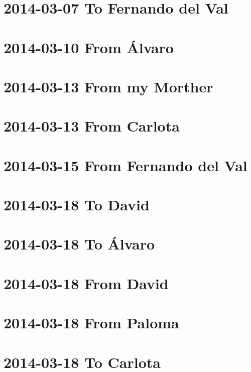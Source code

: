 \documentclass[]{book}
\begin{document}
\hypertarget{to-fernando-del-val}{%
\section{2014-03-07 To Fernando del Val}\label{to-fernando-del-val}}

\hypertarget{from-alvaro}{%
\section{2014-03-10 From Álvaro}\label{from-alvaro}}

\hypertarget{from-my-morther}{%
\section{2014-03-13 From my Morther}\label{from-my-morther}}

\hypertarget{from-carlota}{%
\section{2014-03-13 From Carlota}\label{from-carlota}}

\hypertarget{from-fernando-del-val}{%
\section{2014-03-15 From Fernando del Val}\label{from-fernando-del-val}}

\hypertarget{to-david}{%
\section{2014-03-18 To David}\label{to-david}}

\hypertarget{to-alvaro}{%
\section{2014-03-18 To Álvaro}\label{to-alvaro}}

\hypertarget{from-david}{%
\section{2014-03-18 From David}\label{from-david}}

\hypertarget{from-paloma-1}{%
\section{2014-03-18 From Paloma}\label{from-paloma-1}}

\hypertarget{to-carlota-1}{%
\section{2014-03-18 To Carlota}\label{to-carlota-1}}
\end{document}
